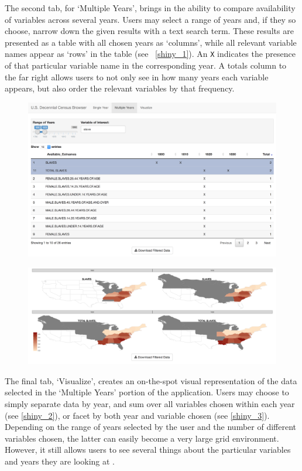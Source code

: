 \documentclass[DIV=calc, paper=a4, fontsize=10pt, twocolumn]{scrartcl}\usepackage[]{graphicx}\usepackage[]{color}
\begin{document}
\par The second tab, for `Multiple Years', brings in the ability to compare availability of variables across several years. Users may select a range of years and, if they so choose, narrow down the given results with a text search term. These results are presented as a table with all chosen years as `columns', while all relevant variable names appear as `rows' in the table (see ~\autoref{shiny_1}). An \texttt{X} indicates the presence of that particular variable name in the corresponding year. A totals column to the far right allows users to not only see in how many years each variable appears, but also order the relevant variables by that frequency.  

\begin{figure}[hbtp]
\includegraphics[width=.48\textwidth]{./figures/search_slaves_40years.png}  
\label{shiny_1}
\end{figure}

\begin{figure}[hbtp]
\centering
\includegraphics[width=.48\textwidth]{./figures/visualize_slaves_40years_sum.png}  
\label{shiny_2}
\end{figure}

\par The final tab, `Visualize', creates an on-the-spot visual representation of the data selected in the `Multiple Years' portion of the application. Users may choose to simply separate data by year, and sum over all variables chosen within each year (see \autoref{shiny_2}), or facet by both year and variable chosen (see \autoref{shiny_3}). Depending on the range of years selected by the user and the number of different variables chosen, the latter can easily become a very large grid environment. However, it still allows users to see several things about the particular variables and years they are looking at .
\end{document}
